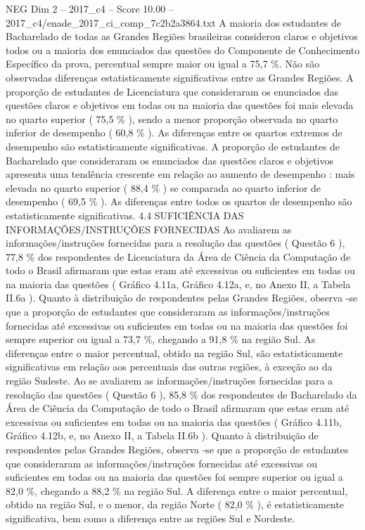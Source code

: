 \begin{textsample}{NEG Dim 2 – 2017\_c4 – Score 10.00 – 2017\_c4/enade\_2017\_ci\_comp\_7c2b2a3864.txt}
A maioria dos estudantes de Bacharelado de todas as Grandes Regiões brasileiras considerou claros e objetivos todos ou a maioria dos enunciados das questões do Componente de Conhecimento Específico da prova, percentual sempre maior ou igual a 75,7 \%.
Não são observadas diferenças estatisticamente significativas entre as Grandes Regiões.
A proporção de estudantes de Licenciatura que consideraram os enunciados das questões claros e objetivos em todas ou na maioria das questões foi mais elevada no quarto superior ( 75,5 \% ), sendo a menor proporção observada no quarto inferior de desempenho ( 60,8 \% ).
As diferenças entre os quartos extremos de desempenho são estatisticamente significativas.
A proporção de estudantes de Bacharelado que consideraram os enunciados das questões claros e objetivos apresenta uma tendência crescente em relação ao aumento de desempenho : mais elevada no quarto superior ( 88,4 \% ) se comparada ao quarto inferior de desempenho ( 69,5 \% ).
As diferenças entre todos os quartos de desempenho são estatisticamente significativas. 4.4 SUFICIÊNCIA DAS INFORMAÇÕES/INSTRUÇÕES FORNECIDAS Ao avaliarem as informações/instruções fornecidas para a resolução das questões ( Questão 6 ), 77,8 \% dos respondentes de Licenciatura da Área de Ciência da Computação de todo o Brasil afirmaram que estas eram até excessivas ou suficientes em todas ou na maioria das questões ( Gráfico 4.11a, Gráfico 4.12a, e, no Anexo II, a Tabela II.6a ).
Quanto à distribuição de respondentes pelas Grandes Regiões, observa -se que a proporção de estudantes que consideraram as informações/instruções fornecidas até excessivas ou suficientes em todas ou na maioria das questões foi sempre superior ou igual a 73,7 \%, chegando a 91,8 \% na região Sul.
As diferenças entre o maior percentual, obtido na região Sul, são estatisticamente significativas em relação aos percentuais das outras regiões, à exceção ao da região Sudeste.
Ao se avaliarem as informações/instruções fornecidas para a resolução das questões ( Questão 6 ), 85,8 \% dos respondentes de Bacharelado da Área de Ciência da Computação de todo o Brasil afirmaram que estas eram até excessivas ou suficientes em todas ou na maioria das questões ( Gráfico 4.11b, Gráfico 4.12b, e, no Anexo II, a Tabela II.6b ).
Quanto à distribuição de respondentes pelas Grandes Regiões, observa -se que a proporção de estudantes que consideraram as informações/instruções fornecidas até excessivas ou suficientes em todas ou na maioria das questões foi sempre superior ou igual a 82,0 \%, chegando a 88,2 \% na região Sul.
A diferença entre o maior percentual, obtido na região Sul, e o menor, da região Norte ( 82,0 \% ), é estatisticamente significativa, bem como a diferença entre as regiões Sul e Nordeste.

\end{textsample}
